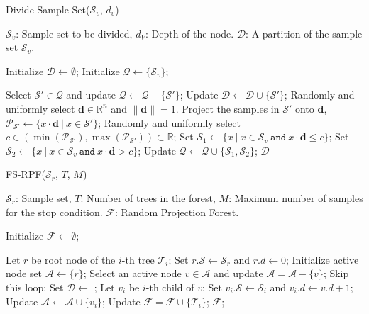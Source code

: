 \begin{algorithm}
\begin{algorithmic}

\caption{Divide Sample Set($\mathcal{S}_v$, $d_v$)}
\Require $\mathcal{S}_v$: Sample set to be divided, $d_V$: Depth of the node.
\Ensure $\mathcal{D}$: A partition of the sample set $\mathcal{S}_v$.

\State Initialize $\mathcal{D}\gets\emptyset$;
\State Initialize $\mathcal{Q}\gets\{\mathcal{S}_v\}$;

\Repeat 
\State Select $\mathcal{S}'\in\mathcal{Q}$ and update $\mathcal{Q}\gets\mathcal{Q}-\{\mathcal{S}'\}$;
\State Update $\mathcal{D}\gets\mathcal{D}\cup\{\mathcal{S}'\}$;
\Else 
\State Randomly and uniformly select $\mathbf{d}\in\mathbb{R}^n$ and $\lVert\mathbf{d}\rVert=1$.
\State Project the samples in $\mathcal{S}'$ onto $\mathbf{d}$, $\mathcal{P_{S'}}\gets\{x\cdot\mathbf{d}~|~x\in\mathcal{S}'\}$;
\State Randomly and uniformly select $c\in(\min(\mathcal{P_{S'}}), \max(\mathcal{P_{S'}}))\subset\mathbb{R}$;
\State Set $\mathcal{S}_1\gets\{x~|~x\in\mathcal{S}_v~\texttt{and}~x\cdot\mathbf{d}\leqslant c\}$;
\State Set $\mathcal{S}_2\gets\{x~|~x\in\mathcal{S}_v~\texttt{and}~x\cdot\mathbf{d}> c\}$;
\State Update $\mathcal{Q}\gets\mathcal{Q}\cup\{\mathcal{S}_1,\mathcal{S}_2\}$;
\EndIf
{}
\State\Return $\mathcal{D}$
\end{algorithmic}
\end{algorithm}

\begin{algorithm}
\begin{algorithmic}
\caption{FS-RPF($\mathcal{S}_r$, $T$, $M$)}
\Require $\mathcal{S}_r$: Sample set, $T$: Number of trees in the forest, $M$: Maximum number of samples for the stop condition.
\Ensure $\mathcal{F}$: Random Projection Forest.

\State Initialize $\mathcal{F}\gets\emptyset$;

\State Let $r$ be root node of the $i$-th tree $\mathcal{T}_i$;
\State Set $r.\mathcal{S}\gets\mathcal{S}_r$ and $r.d\gets0$;
\State Initialize active node set $\mathcal{A}\gets\{r\}$;
\Repeat
\State Select an active node $v\in\mathcal{A}$ and update $\mathcal{A}=\mathcal{A}-\{v\}$;
\State Skip this loop;
\EndIf
\State Set $\mathcal{D}\gets$ ;
\State Let $v_i$ be $i$-th child of $v$;
\State Set $v_i.\mathcal{S}\gets\mathcal{S}_i$ and $v_i.d\gets v.d+1$;
\State Update $\mathcal{A}\gets\mathcal{A}\cup\{v_i\}$;
\EndFor
{}
\State Update $\mathcal{F}=\mathcal{F}\cup\{\mathcal{T}_i\}$;
\EndFor
\State \Return $\mathcal{F}$;
\end{algorithmic}
\end{algorithm}

